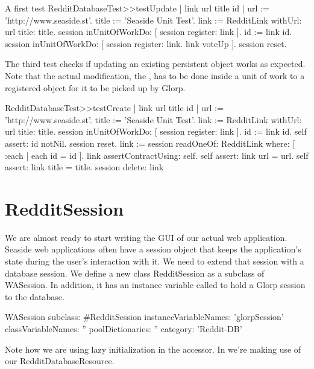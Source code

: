 \documentclass[a4paper,10pt,twoside]{book}
\begin{document}
\begin{code}{A first test}
RedditDatabaseTest>>testUpdate
    | link url title id |
    url := 'http://www.seaside.st'. 
    title := 'Seaside Unit Test'. 
    link := RedditLink withUrl: url title: title.
    session inUnitOfWorkDo: [ session register: link ]. 
         id := link id. 
     session inUnitOfWorkDo: [ session register: link. link voteUp ].      
     session reset.
\end{code}

 The third test checks if updating an existing persistent object works as expected. Note that the actual modification, the , has to be done inside a unit of work to a registered object for it to be picked up by Glorp.

\begin{code}{}
RedditDatabaseTest>>testCreate
     | link url title id |
     url := 'http://www.seaside.st'.
     title := 'Seaside Unit Test'.
     link := RedditLink withUrl: url title: title.
     session inUnitOfWorkDo: [ session register: link ].
     id := link id.
     self assert: id notNil. 
     session reset.
     link := session readOneOf: RedditLink where: [ :each | each id = id ]. 
     link assertContractUsing: self.
     self assert: link url = url.
     self assert: link title = title. 
     session delete: link
\end{code}


\section{RedditSession}
We are almost ready to start writing the GUI of our actual web application. Seaside web applications often have a session object that keeps the application's state during the user's interaction with it. We need to extend that session with a database session. We define a new class  RedditSession as a subclass of WASession. In addition, it has an instance variable called  to hold a Glorp session to the database.

\begin{code}{}
WASession subclass: #RedditSession
   instanceVariableNames: 'glorpSession' 
   classVariableNames: '' 
   poolDictionaries: '' 
   category: 'Reddit-DB'
\end{code}

Note how we are using lazy initialization in the  accessor. In  we're making use of our RedditDatabaseResource. 
\end{document}
